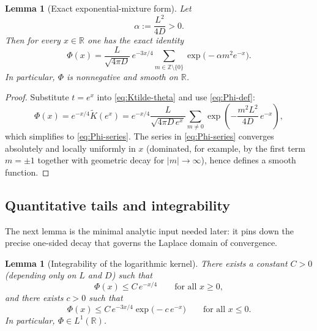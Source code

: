 \documentclass[12pt]{amsart}
\newtheorem{lemma}[theorem]{Lemma}
\theoremstyle{definition}
\theoremstyle{remark}
\begin{document}
\begin{lemma}[Exact exponential-mixture form]
\label{lem:Phi-series}
Let
\[
\alpha:=\frac{L^2}{4D}>0.
\]
Then for every $x\in\mathbb R$ one has the exact identity
\begin{equation}
\label{eq:Phi-series}
\Phi(x)
=
\frac{L}{\sqrt{4\pi D}}\,
e^{-3x/4}
\sum_{m\in\mathbb Z\setminus\{0\}}
\exp\!\big(-\alpha m^2 e^{-x}\big).
\end{equation}
In particular, $\Phi$ is nonnegative and smooth on $\mathbb R$.
\end{lemma}

\begin{proof}
Substitute $t=e^{x}$ into \eqref{eq:Ktilde-theta} and use \eqref{eq:Phi-def}:
\[
\Phi(x)=e^{-x/4}\widetilde K(e^x)
=
e^{-x/4}\frac{L}{\sqrt{4\pi D\,e^x}}
\sum_{m\neq 0}\exp\!\left(-\frac{m^2L^2}{4D}\,e^{-x}\right),
\]
which simplifies to \eqref{eq:Phi-series}. The series in \eqref{eq:Phi-series} converges
absolutely and locally uniformly in $x$ (dominated, for example, by the first term $m=\pm1$
together with geometric decay for $|m|\to\infty$), hence defines a smooth function.
\end{proof}

\subsection{Quantitative tails and integrability}
\label{subsec:phi-tails}

The next lemma is the minimal analytic input needed later: it pins down the precise
one-sided decay that governs the Laplace domain of convergence.

\begin{lemma}[Integrability of the logarithmic kernel]
\label{lem:Phi-L1-new}
There exists a constant $C>0$ (depending only on $L$ and $D$) such that
\begin{equation}
\label{eq:Phi-tail-plus-new}
\Phi(x)\le C\,e^{-x/4}\qquad\text{for all }x\ge 0,
\end{equation}
and there exists $c>0$ such that
\begin{equation}
\label{eq:Phi-tail-minus-new}
\Phi(x)\le C\,e^{-3x/4}\exp\!\big(-c\,e^{-x}\big)\qquad\text{for all }x\le 0.
\end{equation}
In particular, $\Phi\in L^1(\mathbb R)$.
\end{lemma}
\end{document}
